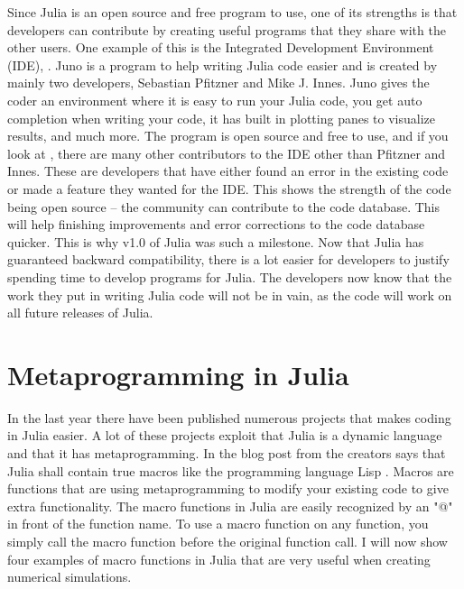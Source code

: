 Since Julia is an open source and free program to use, one of its strengths is that developers can contribute by creating useful programs that they share with the other users. One example of this is the Integrated Development Environment (IDE), \emph{\cite{JunoIDE}}. Juno is a program to help writing Julia code easier and is created by mainly two developers, Sebastian Pfitzner and Mike J. Innes. Juno gives the coder an environment where it is easy to run your Julia code, you get auto completion when writing your code, it has built in plotting panes to visualize results, and much more. The program is open source and free to use, and if you look at \emph{\cite{JunoGithub}}, there are many other contributors to the IDE other than Pfitzner and Innes. These are developers that have either found an error in the existing code or made a feature they wanted for the IDE. This shows the strength of the code being open source -- the community can contribute to the code database. This will help finishing improvements and error corrections to the code database quicker. This is why v1.0 of Julia was such a milestone. Now that Julia has guaranteed backward compatibility, there is a lot easier for developers to justify spending time to develop programs for Julia. The developers now know that the work they put in writing Julia code will not be in vain, as the code will work on all future releases of Julia. 

\section{Metaprogramming in Julia}
\label{sec:Metaprogramming}
In the last year there have been published numerous projects that makes coding in Julia easier. A lot of these projects exploit that Julia is a dynamic language and that it has metaprogramming. In the blog post from \citet{juliaBlogRelease2012} the creators says that Julia shall contain true macros like the programming language Lisp \emph{\citep{Lisp}}. Macros are functions that are using metaprogramming to modify your existing code to give extra functionality. The macro functions in Julia are easily recognized by an "@" in front of the function name. To use a macro function on any function, you simply call the macro function before the original function call. I will now show four examples of macro functions in Julia that are very useful when creating numerical simulations.
